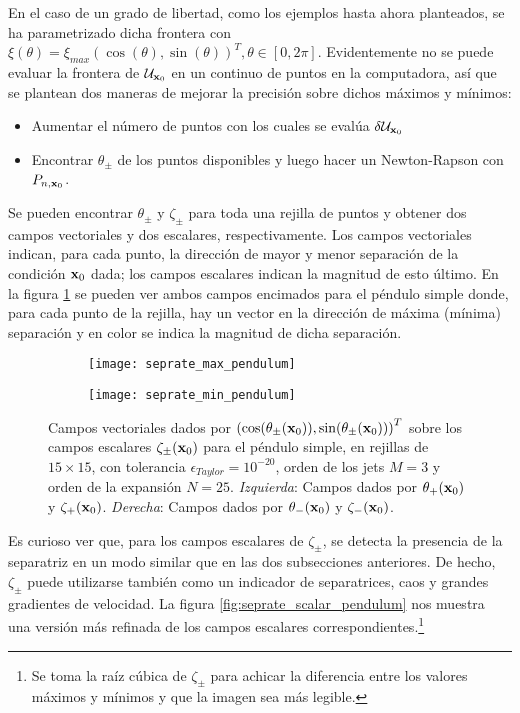 En el caso de un grado de libertad, como los ejemplos hasta ahora planteados, se ha parametrizado dicha frontera con $\xi(\theta) = \xi_{max} \left( \cos(\theta), \sin(\theta) \right)^T, \theta \in [0,2\pi]$. Evidentemente no se puede evaluar la frontera de $\mathcal{U}_{\mathbf{x}_0}$ en un continuo de puntos en la computadora, así que se plantean dos maneras de mejorar la precisión sobre dichos máximos y mínimos: 
\begin{itemize}
\item Aumentar el número de puntos con los cuales se evalúa $\delta \mathcal{U}_{\mathbf{x}_0}$
\item Encontrar $\theta_{\pm}$ de los puntos disponibles y luego hacer un Newton-Rapson con $P_{n,\mathbf{x}_0}$. 
\end{itemize} 

Se pueden encontrar $\theta_\pm$ y $\zeta_\pm$ para toda una rejilla de puntos y obtener dos campos vectoriales y dos escalares, respectivamente. Los campos vectoriales indican, para cada punto, la dirección de mayor y menor separación de la condición $\mathbf{x}_0$ dada; los campos escalares indican la magnitud de esto último. En la figura \ref{fig:seprate_pendulum} se pueden ver ambos campos encimados para el péndulo simple donde, para cada punto de la rejilla, hay un vector en la dirección de máxima (mínima) separación y en color se indica la magnitud de dicha separación.

\begin{figure}[h!]
\centering
\begin{subfigure}{0.49\textwidth}
	\centering
	\texttt{[image: seprate\_max\_pendulum]}
\end{subfigure}
%
\begin{subfigure}{0.49\textwidth}
	\centering
	\texttt{[image: seprate\_min\_pendulum]}
\end{subfigure}
\caption{ Campos vectoriales dados por $\left( \cos(\theta_\pm(\mathbf{x}_0)),\sin(\theta_\pm(\mathbf{x}_0)) \right)^T$ sobre los campos escalares $\zeta_\pm(\mathbf{x}_0)$ para el péndulo simple, en rejillas de $15\times15$, con tolerancia $\epsilon_{Taylor} = 10^{-20}$, orden de los jets $M=3$ y orden de la expansión $N=25$. \textit{Izquierda}: Campos dados por $\theta_+(\mathbf{x}_0)$ y $\zeta_+(\mathbf{x}_0)$. \textit{Derecha}: Campos dados por $\theta_-(\mathbf{x}_0)$ y $\zeta_-(\mathbf{x}_0)$.}
\label{fig:seprate_pendulum}
\end{figure}

Es curioso ver que, para los campos escalares de $\zeta_\pm$, se detecta la presencia de la separatriz en un modo similar que en las dos subsecciones anteriores. De hecho, $\zeta_\pm$ puede utilizarse también como un indicador de separatrices, caos y grandes gradientes de velocidad. La figura \ref{fig:seprate_scalar_pendulum} nos muestra una versión más refinada de los campos escalares correspondientes.\footnote{Se toma la raíz cúbica de $\zeta_\pm$ para achicar la diferencia entre los valores máximos y mínimos y que la imagen sea más legible.} 

